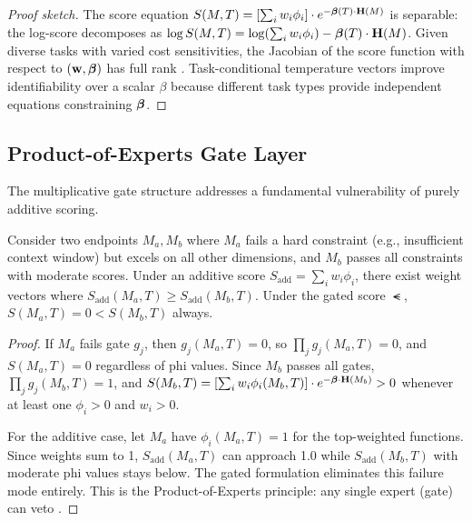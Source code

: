 \begin{proof}[Proof sketch]
The score equation $S(M,T) = [\sum_i w_i \phi_i] \cdot e^{-\boldsymbol{\beta}(T) \cdot \mathbf{H}(M)}$ is separable: the log-score decomposes as $\log S(M,T) = \log(\sum_i w_i \phi_i) - \boldsymbol{\beta}(T) \cdot \mathbf{H}(M)$. Given diverse tasks with varied cost sensitivities, the Jacobian of the score function with respect to $(\mathbf{w}, \boldsymbol{\beta})$ has full rank \citep{rothenberg1971identification}. Task-conditional temperature vectors improve identifiability over a scalar $\beta$ because different task types provide independent equations constraining $\boldsymbol{\beta}$.
\end{proof}

\subsection{Product-of-Experts Gate Layer}

The multiplicative gate structure addresses a fundamental vulnerability of purely additive scoring.

\begin{proposition}
\label{prop:poe}
Consider two endpoints $M_a, M_b$ where $M_a$ fails a hard constraint (e.g., insufficient context window) but excels on all other dimensions, and $M_b$ passes all constraints with moderate scores. Under an additive score $S_{\text{add}} = \sum_i w_i \phi_i$, there exist weight vectors where $S_{\text{add}}(M_a, T) \geq S_{\text{add}}(M_b, T)$. Under the gated score $\smt$, $S(M_a, T) = 0 < S(M_b, T)$ always.
\end{proposition}

\begin{proof}
If $M_a$ fails gate $g_j$, then $g_j(M_a, T) = 0$, so $\prod_j g_j(M_a, T) = 0$, and $S(M_a, T) = 0$ regardless of phi values. Since $M_b$ passes all gates, $\prod_j g_j(M_b, T) = 1$, and $S(M_b, T) = [\sum_i w_i \phi_i(M_b, T)] \cdot e^{-\boldsymbol{\beta} \cdot \mathbf{H}(M_b)} > 0$ whenever at least one $\phi_i > 0$ and $w_i > 0$.

For the additive case, let $M_a$ have $\phi_i(M_a, T) = 1$ for the top-weighted functions. Since weights sum to 1, $S_{\text{add}}(M_a, T)$ can approach 1.0 while $S_{\text{add}}(M_b, T)$ with moderate phi values stays below. The gated formulation eliminates this failure mode entirely. This is the Product-of-Experts principle: any single expert (gate) can veto \citep{hinton2002poe}.
\end{proof}

